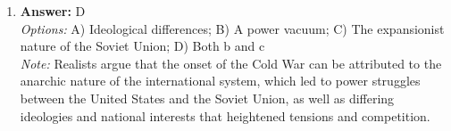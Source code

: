 \documentclass[12pt]{article}
\begin{document}
\begin{enumerate}[label=\arabic*.]
\\ \textit{Note:} The correct answer highlights the critical concerns of bureaucratic politics in nuclear weapons management, emphasizing the importance of decision-making processes regarding the identification and response to nuclear threats, as well as the control and authority over these weapons, which are essential for ensuring national and global security.
\item \textbf{Answer:} D
\\ \textit{Options:} A) Ideological differences; B) A power vacuum; C) The expansionist nature of the Soviet Union; D) Both b and c
\\ \textit{Note:} Realists argue that the onset of the Cold War can be attributed to the anarchic nature of the international system, which led to power struggles between the United States and the Soviet Union, as well as differing ideologies and national interests that heightened tensions and competition.
\end{enumerate}
\end{document}
